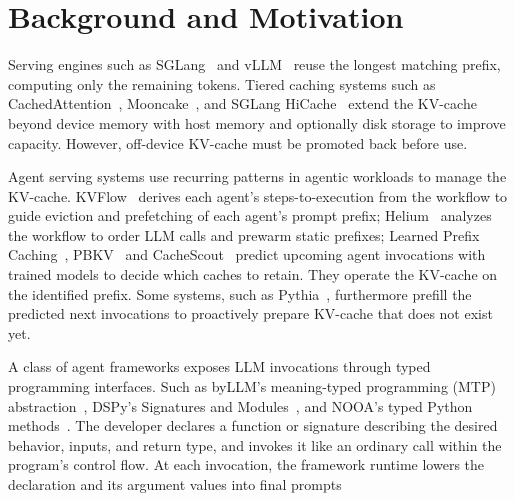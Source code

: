 \section{Background and Motivation}
\label{sec:bg_mt}
Serving engines such as SGLang~\cite{zheng2024sglang} and vLLM~\cite{kwon2023pagedattention} reuse the longest matching prefix, computing only the remaining tokens. Tiered caching systems such as CachedAttention~\cite{gao2024cachedattention}, Mooncake~\cite{qin2025mooncake}, and SGLang HiCache~\cite{sglang2026hicache} extend the KV-cache beyond device memory with host memory and optionally disk storage to improve capacity. However, off-device KV-cache must be promoted back before use.

Agent serving systems use recurring patterns in agentic workloads to manage the KV-cache. KVFlow~\cite{pan2025kvflow} derives each agent's steps-to-execution from the workflow to guide eviction and prefetching of each agent's prompt prefix; Helium~\cite{wadlom2026helium} analyzes the workflow to order LLM calls and prewarm static prefixes; Learned Prefix Caching~\cite{yang2025lpc}, PBKV~\cite{zheng2026pbkv} and CacheScout~\cite{zhang2026cachescout} predict upcoming agent invocations with trained models to decide which caches to retain. They operate the KV-cache on the identified prefix. Some systems, such as Pythia~\cite{yu2026pythia}, furthermore prefill the predicted next invocations to proactively prepare KV-cache that does not exist yet. 




A class of agent frameworks exposes LLM invocations through typed programming interfaces. Such as byLLM's meaning-typed programming (MTP) abstraction~\cite{dantanarayana2025mtp}, DSPy's Signatures and Modules~\cite{khattab2024dspy}, and NOOA's typed Python methods~\cite{furgale2026nooa}. The developer declares a function or signature describing the desired behavior, inputs, and return type, and invokes it like an ordinary call within the program's control flow. At each invocation, the framework runtime lowers the declaration and its argument values into final prompts

